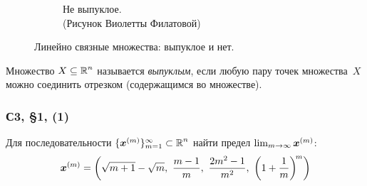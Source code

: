 \documentclass[a4paper,12pt]{article}
\begin{document}
\begin{figure}[ht]
\begin{subfigure}[b]{0.3\textwidth}
      \caption{Не выпуклое.\\{\scriptsize (Рисунок Виолетты Филатовой)}}
    \end{subfigure}
    
    \caption{Линейно связные множества: выпуклое и нет.}
    \label{fig:ameba-and-convex}
  \end{figure}

  \begin{definition}
      Множество $X \hm\subseteq \RR^n$ называется \emph{выпуклым},
      если любую пару точек множества~$X$ можно соединить отрезком (содержащимся во множестве).
  \end{definition}
  
  

  \subsubsection{С3, \S 1, (1)}

  Для последовательности $\{\bds x^{(m)}\}_{m = 1}^{\infty} \hm\subset \RR^n$ найти предел $\lim_{m \to \infty} \boldsymbol x^{(m)}$:
  \[
    \bds x^{(m)} = \left(
      \sqrt{m + 1} - \sqrt{m},\ 
      \frac{m - 1}{m},\ 
      \frac{2m^2 - 1}{m^2},\ 
      \left(1 + \frac{1}{m}\right)^{\! m}
    \right)
  \]
  
\end{document}
